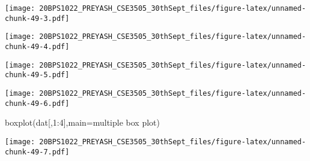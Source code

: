 \documentclass[
]{article}
\newenvironment{Shaded}{\begin{snugshade}}{\end{snugshade}}
\newcommand{\AttributeTok}[1]{\textcolor[rgb]{0.77,0.63,0.00}{#1}}
\newcommand{\CommentTok}[1]{\textcolor[rgb]{0.56,0.35,0.01}{\textit{#1}}}
\newcommand{\ConstantTok}[1]{\textcolor[rgb]{0.00,0.00,0.00}{#1}}
\newcommand{\DecValTok}[1]{\textcolor[rgb]{0.00,0.00,0.81}{#1}}
\newcommand{\FunctionTok}[1]{\textcolor[rgb]{0.00,0.00,0.00}{#1}}
\newcommand{\NormalTok}[1]{#1}
\newcommand{\SpecialCharTok}[1]{\textcolor[rgb]{0.00,0.00,0.00}{#1}}
\newcommand{\StringTok}[1]{\textcolor[rgb]{0.31,0.60,0.02}{#1}}
\begin{document}
\texttt{[image: 20BPS1022\_PREYASH\_CSE3505\_30thSept\_files/figure-latex/unnamed-chunk-49-3.pdf]}

\begin{Shaded}
\end{Shaded}

\texttt{[image: 20BPS1022\_PREYASH\_CSE3505\_30thSept\_files/figure-latex/unnamed-chunk-49-4.pdf]}

\begin{Shaded}
\end{Shaded}

\texttt{[image: 20BPS1022\_PREYASH\_CSE3505\_30thSept\_files/figure-latex/unnamed-chunk-49-5.pdf]}

\begin{Shaded}
\end{Shaded}

\texttt{[image: 20BPS1022\_PREYASH\_CSE3505\_30thSept\_files/figure-latex/unnamed-chunk-49-6.pdf]}

\begin{Shaded}
\begin{Highlighting}[]
\FunctionTok{boxplot}\NormalTok{(dat[,}\DecValTok{1}\SpecialCharTok{:}\DecValTok{4}\NormalTok{],}\AttributeTok{main=}\StringTok{\textquotesingle{}multiple box plot\textquotesingle{}}\NormalTok{)}
\end{Highlighting}
\end{Shaded}

\texttt{[image: 20BPS1022\_PREYASH\_CSE3505\_30thSept\_files/figure-latex/unnamed-chunk-49-7.pdf]}

\begin{Shaded}
\end{Shaded}
\end{document}
